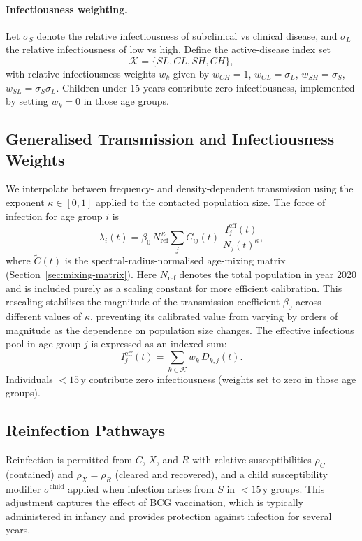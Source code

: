 \documentclass[11pt]{article}
\begin{document}
\paragraph{Infectiousness weighting.}
Let \(\sigma_S\) denote the relative infectiousness of subclinical vs clinical disease, and \(\sigma_L\) the relative infectiousness of low vs high. Define the active-disease index set
\[
\mathcal{K}=\{SL,CL,SH,CH\},
\]
with relative infectiousness weights \(w_k\) given by \(w_{CH}=1\), \(w_{CL}=\sigma_L\), \(w_{SH}=\sigma_S\), \(w_{SL}=\sigma_S\sigma_L\). Children under 15 years contribute zero infectiousness, implemented by setting \(w_k=0\) in those age groups.

\subsection{Generalised Transmission and Infectiousness Weights}

We interpolate between frequency- and density-dependent transmission using the exponent \(\kappa\in[0,1]\) applied to the contacted population size. The force of infection for age group \(i\) is
\[
\lambda_i(t)
=
\beta_0\, N_{\mathrm{ref}}^{\,\kappa}
\sum_{j}
\tilde{C}_{ij}(t)\;
\frac{I^{\mathrm{eff}}_j(t)}{N_j(t)^{\kappa}},
\]
where \(\tilde{C}(t)\) is the spectral-radius-normalised age-mixing matrix (Section~\ref{sec:mixing-matrix}).  Here \(N_{\mathrm{ref}}\) denotes the total population in year 2020 and is included purely as a scaling constant for more efficient calibration. This rescaling stabilises the magnitude of the transmission coefficient \(\beta_0\) across different values of \(\kappa\), preventing its calibrated value from varying by orders of magnitude as the dependence on population size changes.
The effective infectious pool in age group \(j\) is expressed as an indexed sum:
\[
I^{\mathrm{eff}}_j(t) =
\sum_{k\in\mathcal{K}} w_k\, D_{k,j}(t).
\]
Individuals $<15$\,y contribute zero infectiousness (weights set to zero in those age groups).

\subsection{Reinfection Pathways}

Reinfection is permitted from \(C\), \(X\), and \(R\) with relative susceptibilities \(\rho_C\) (contained) and \(\rho_X=\rho_R\) (cleared and recovered), and a child susceptibility modifier \(\sigma^{\text{child}}\) applied when infection arises from \(S\) in $<15$\,y groups.
This adjustment captures the effect of BCG vaccination, which is typically administered in infancy and provides protection against infection for several years.
\end{document}
